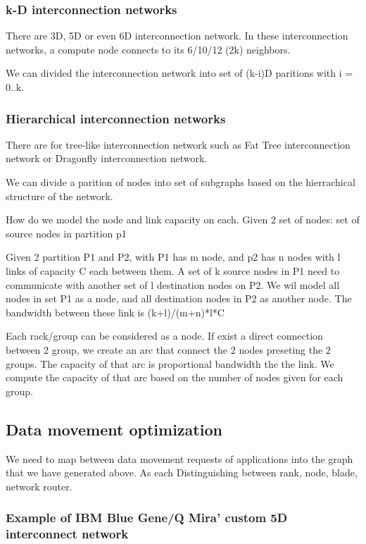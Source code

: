 \documentclass[letter]{article}
\begin{document}
\subsubsection{k-D interconnection networks}
There are 3D, 5D or even 6D interconnection network. In these interconnection networks, a compute node connects to its 6/10/12 (2k) neighbors. %

We can divided the interconnection network into set of (k-i)D paritions with i = 0..k.

\subsubsection{Hierarchical interconnection networks}
There are for tree-like interconnection network such as Fat Tree interconnection network or Dragonfly interconnection network. 

We can divide a parition of nodes into set of subgraphs based on the hierrachical structure of the network.

How do we model the node and link capacity on each. Given 2 set of nodes: set of source nodes in partition p1

Given 2 partition P1 and P2, with P1 has m node, and p2 has n nodes with l links of capacity C each between them. A set of k source nodes in P1 need to communicate with another set of l destination nodes on P2. We wil model all nodes in set P1 as a node, and all destination nodes in P2 as another node. The bandwidth between these link is (k+l)/(m+n)*l*C

Each rack/group can be considered as a node. If exist a direct connection between 2 group, we create an arc that connect the 2 nodes preseting the 2 groups. The capacity of that arc is proportional bandwidth the the link. We compute the capacity of that arc based on the number of nodes given for each group.

\subsection{Data movement optimization}
We need to map between data movement requests of applications into the graph that we have generated above. As each 
Distinguishing between rank, node, blade, network router.

\subsubsection{Example of IBM Blue Gene/Q Mira' custom 5D interconnect network}
\end{document}
